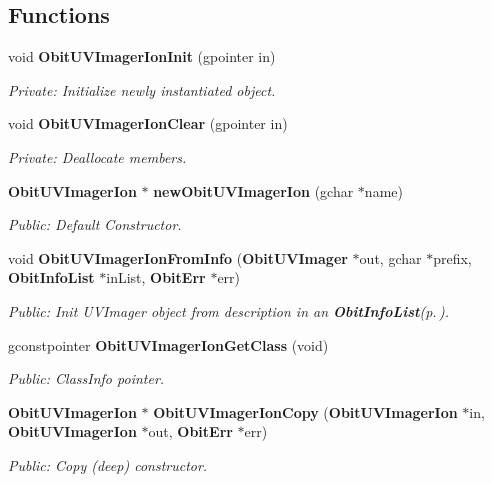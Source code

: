 \subsection*{Functions}
\begin{CompactItemize}
\item 
void {\bf Obit\-UVImager\-Ion\-Init} (gpointer in)
\begin{CompactList}\small\item\em Private: Initialize newly instantiated object. \item\end{CompactList}\item 
void {\bf Obit\-UVImager\-Ion\-Clear} (gpointer in)
\begin{CompactList}\small\item\em Private: Deallocate members. \item\end{CompactList}\item 
{\bf Obit\-UVImager\-Ion} $\ast$ {\bf new\-Obit\-UVImager\-Ion} (gchar $\ast$name)
\begin{CompactList}\small\item\em Public: Default Constructor. \item\end{CompactList}\item 
void {\bf Obit\-UVImager\-Ion\-From\-Info} ({\bf Obit\-UVImager} $\ast$out, gchar $\ast$prefix, {\bf Obit\-Info\-List} $\ast$in\-List, {\bf Obit\-Err} $\ast$err)
\begin{CompactList}\small\item\em Public: Init UVImager object from description in an {\bf Obit\-Info\-List}{\rm (p.\,\pageref{structObitInfoList})}. \item\end{CompactList}\item 
gconstpointer {\bf Obit\-UVImager\-Ion\-Get\-Class} (void)
\begin{CompactList}\small\item\em Public: Class\-Info pointer. \item\end{CompactList}\item 
{\bf Obit\-UVImager\-Ion} $\ast$ {\bf Obit\-UVImager\-Ion\-Copy} ({\bf Obit\-UVImager\-Ion} $\ast$in, {\bf Obit\-UVImager\-Ion} $\ast$out, {\bf Obit\-Err} $\ast$err)
\begin{CompactList}\small\item\em Public: Copy (deep) constructor. \item\end{CompactList}\item 

\end{CompactItemize}
